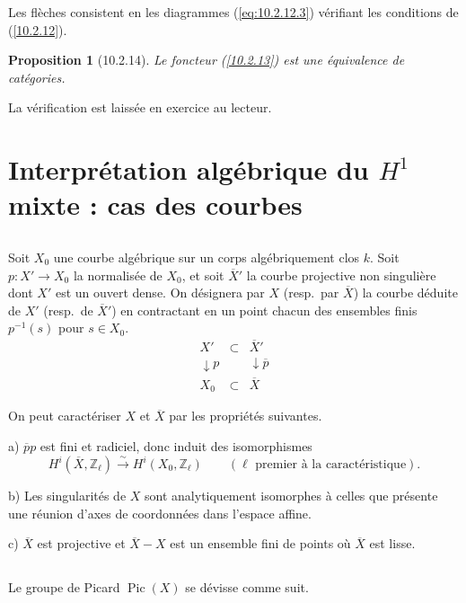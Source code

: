 \documentclass[12pt,a4paper]{amsart}
\theoremstyle{plain}
\newtheorem{proposition}[lemme]{Proposition}
\theoremstyle{definition}
\theoremstyle{remark}
\DeclareMathOperator{\Pic}{Pic}
\numberwithin{equation}{section}
\begin{document}
Les flèches consistent en les diagrammes (\ref{eq:10.2.12.3}) vérifiant les conditions de (\ref{10.2.12}).

\begin{proposition}[10.2.14]\label{prop:10.2.14}
Le foncteur (\ref{10.2.13}) est une équivalence de catégories.
\end{proposition}

La vérification est laissée en exercice au lecteur.

\section{Interprétation algébrique du $H^1$ mixte : cas des courbes}\label{sec:10.3}

\subsection{}\label{10.3.1}
Soit $X_0$ une courbe algébrique sur un corps algébriquement clos $k$. Soit $p:X'\to X_0$ la normalisée de $X_0$, et soit $\overline{X}'$ la courbe projective non singulière dont $X'$ est un ouvert dense. On désignera par $X$ (resp.~par $\overline{X}$) la courbe déduite de $X'$ (resp.~de $\overline{X}'$) en contractant en un point chacun des ensembles finis $p^{-1}(s)$ pour $s\in X_0$.
\[
\begin{array}{ccc}
X' & \subset & \overline{X}' \\
\downarrow{p} & & \downarrow{\overline{p}} \\
X_0 & \subset & \overline{X}
\end{array}
\]

On peut caractériser $X$ et $\overline{X}$ par les propriétés suivantes.

a) $\overline{p}p$ est fini et radiciel, donc induit des isomorphismes
\[
H^i(\overline{X},\mathbb{Z}_\ell)\xrightarrow{\sim}H^i(X_0,\mathbb{Z}_\ell) \qquad (\ell\text{ premier à la caractéristique}).
\]

b) Les singularités de $X$ sont analytiquement isomorphes à celles que présente une réunion d'axes de coordonnées dans l'espace affine.

c) $\overline{X}$ est projective et $\overline{X}-X$ est un ensemble fini de points où $\overline{X}$ est lisse.

\subsection{}\label{10.3.2}
Le groupe de Picard $\Pic(X)$ se dévisse comme suit.
\end{document}
